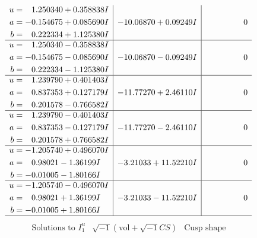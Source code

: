 \documentclass[1p]{elsarticle_modified}
\theoremstyle{definition}
\newcommand{\I}{\sqrt{-1}}
\begin{document}
$$\begin{array}{c|c|c}
\begin{aligned}
u &= \phantom{-}1.250340 + 0.358838 I \\
a &= -0.154675 + 0.085690 I \\
b &= \phantom{-}0.222334 + 1.125380 I\end{aligned}
 & -10.06870 + 0.09249 I & \phantom{-0.000000 } 0 \\ \hline\begin{aligned}
u &= \phantom{-}1.250340 - 0.358838 I \\
a &= -0.154675 - 0.085690 I \\
b &= \phantom{-}0.222334 - 1.125380 I\end{aligned}
 & -10.06870 - 0.09249 I & \phantom{-0.000000 } 0 \\ \hline\begin{aligned}
u &= \phantom{-}1.239790 + 0.401403 I \\
a &= \phantom{-}0.837353 + 0.127179 I \\
b &= \phantom{-}0.201578 - 0.766582 I\end{aligned}
 & -11.77270 + 2.46110 I & \phantom{-0.000000 } 0 \\ \hline\begin{aligned}
u &= \phantom{-}1.239790 - 0.401403 I \\
a &= \phantom{-}0.837353 - 0.127179 I \\
b &= \phantom{-}0.201578 + 0.766582 I\end{aligned}
 & -11.77270 - 2.46110 I & \phantom{-0.000000 } 0 \\ \hline\begin{aligned}
u &= -1.205740 + 0.496070 I \\
a &= \phantom{-}0.98021 - 1.36199 I \\
b &= -0.01005 - 1.80166 I\end{aligned}
 & -3.21033 + 11.52210 I & \phantom{-0.000000 } 0 \\ \hline\begin{aligned}
u &= -1.205740 - 0.496070 I \\
a &= \phantom{-}0.98021 + 1.36199 I \\
b &= -0.01005 + 1.80166 I\end{aligned}
 & -3.21033 - 11.52210 I & \phantom{-0.000000 } 0\\
 \hline 
 \end{array}$$\newpage$$\begin{array}{c|c|c}  
\text{Solutions to }I^u_{1}& \I (\text{vol} + \sqrt{-1}CS) & \text{Cusp shape}\\
 \hline 
\begin{aligned}

\end{aligned}
\end{array}$$
\end{document}
